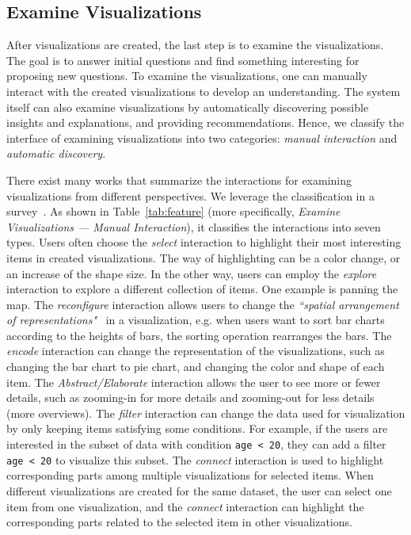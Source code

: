 \documentclass[11pt]{article}
\newcommand{\stitle}[1]{ \noindent{\bf #1.\xspace}}
\begin{document}
\subsection{Examine Visualizations}
After visualizations are created, the last step is to examine the visualizations. The goal is to answer initial questions and find something interesting for proposing new questions. To examine the visualizations, one can manually interact with the created visualizations to develop an understanding. The system itself can also examine visualizations by automatically discovering possible insights and explanations, and providing recommendations. Hence, we classify the interface of examining visualizations into two categories: \emph{manual interaction} and \emph{automatic discovery}.


\stitle{Examination with Manual Interaction}
There exist many works that summarize the interactions for examining visualizations from different perspectives. We leverage the classification in a survey~\cite{DBLP:journals/tvcg/YiKSJ07}. As shown in Table~\ref{tab:feature} (more specifically, \emph{Examine Visualizations --- Manual Interaction}), it classifies the interactions into seven types. Users often choose the \emph{select} interaction to highlight their most interesting items in created visualizations. The way of highlighting can be a color change, or an increase of the shape size. In the other way, users can employ the \emph{explore} interaction to explore a different collection of items. One example is panning the map. The \emph{reconfigure} interaction allows users to change the \emph{``spatial arrangement of representations"}~\cite{DBLP:journals/tvcg/YiKSJ07} in a visualization, e.g. when users want to sort bar charts according to the heights of bars, the sorting operation rearranges the bars. The \emph{encode} interaction can change the representation of the visualizations, such as changing the bar chart to pie chart, and changing the color and shape of each item. The \emph{Abstract/Elaborate} interaction allows the user to see more or fewer details, such as zooming-in for more details and zooming-out for less details (more overviews). The \emph{filter} interaction can change the data used for visualization by only keeping items satisfying some conditions. For example, if the users are interested in the subset of data with condition \texttt{age < 20}, they can add a filter \texttt{age < 20} to visualize this subset. The \emph{connect} interaction is used to highlight corresponding parts among multiple visualizations for selected items. When different visualizations are created for the same dataset, the user can select one item from one visualization, and the \emph{connect} interaction can highlight the corresponding parts related to the selected item in other visualizations. 
\end{document}
